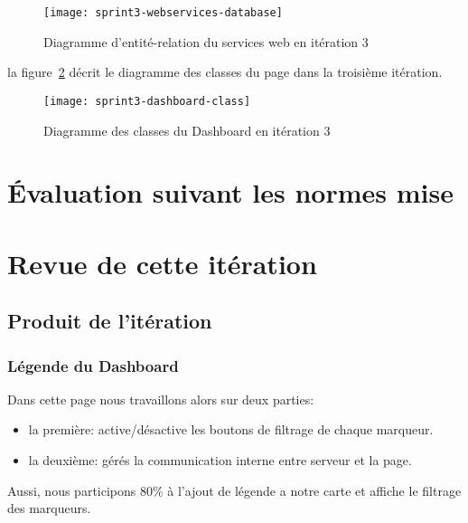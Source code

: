 \begin{figure}[htbp]
    \centering
    \texttt{[image: sprint3-webservices-database]}
    \caption{Diagramme d'entité-relation du services web en itération 3}
    \label{fig:sprint3-webservices-database}
\end{figure}

la figure~\ref{fig:sprint3-dashboard-classs} décrit le diagramme des classes du
page  dans la troisième itération.

\begin{figure}[htbp]
    \centering
    \texttt{[image: sprint3-dashboard-class]}
    \caption{Diagramme des classes du Dashboard en itération 3}
    \label{fig:sprint3-dashboard-classs}
\end{figure}

\section{Évaluation suivant les normes mise}

\TODO{}

\section{Revue de cette itération}


\subsection{Produit de l'itération}

\subsubsection{Légende du Dashboard}
Dans cette page nous travaillons alors sur deux parties:

\begin{itemize}
    \item la première: active/désactive les boutons de filtrage de chaque
        marqueur.
    \item la deuxième: gérés la communication interne entre serveur et la page.
\end{itemize}

Aussi, nous participons 80\% à l'ajout de légende a notre carte et affiche le
filtrage des marqueurs.

